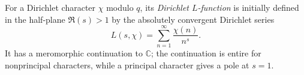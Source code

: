 
For a Dirichlet character $\chi$ modulo $q$, its \emph{Dirichlet $L$-function} is initially defined in the half-plane $\Re(s)>1$ by the absolutely convergent Dirichlet series
\[
L(s,\chi)=\sum_{n=1}^{\infty}\frac{\chi(n)}{n^s}.
\]
It has a meromorphic continuation to $\mathbb C$; the continuation is entire for nonprincipal characters, while a principal character gives a pole at $s=1$.
